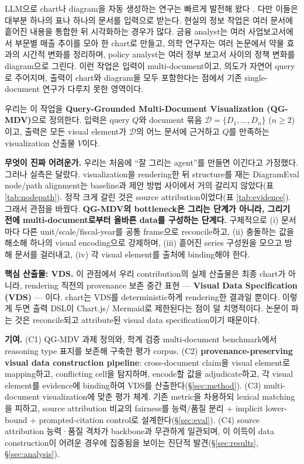 \documentclass[11pt]{article}
\begin{document}
LLM으로 chart나 diagram을 자동 생성하는 연구는 빠르게 발전해 왔다 \cite{han2023chartllama,
yang2024chartmimic}. 다만 이들은 대부분 하나의 표나 하나의 문서를 입력으로 받는다. 현실의 정보
작업은 여러 문서에 흩어진 내용을 통합한 뒤 시각화하는 경우가 많다. 금융 analyst는 여러
사업보고서에서 부문별 매출 추이를 모아 한 chart로 만들고, 의학 연구자는 여러 논문에서 약물 효과의
시간적 변화를 정리하며, policy analyst는 여러 정부 보고서 사이의 정책 변화를 diagram으로 그린다.
이런 작업은 입력이 multi-document이고, 의도가 자연어 query로 주어지며, 출력이 chart와 diagram을
모두 포함한다는 점에서 기존 single-document 연구가 다루지 못한 영역이다.

우리는 이 작업을 \textbf{Query-Grounded Multi-Document Visualization (QG-MDV)}으로 정의한다.
입력은 query $Q$와 document 묶음 $\mathcal{D}=\{D_1,\dots,D_n\}$ ($n\geq 2$)이고, 출력은 모든
visual element가 $\mathcal{D}$의 어느 문서에 근거하고 $Q$를 만족하는 visualization 산출물 $V$이다.

\textbf{무엇이 진짜 어려운가.} 우리는 처음에 ``잘 그리는 agent''를 만들면 이긴다고 가정했다.
그러나 실측은 달랐다. visualization을 rendering한 뒤 structure를 재는 DiagramEval node/path
alignment는 baseline과 제안 방법 사이에서 거의 갈리지 않았다(표 \ref{tab:nodepath}). 정작 크게
갈린 것은 source attribution이었다(표 \ref{tab:evidence}). 그래서 관점을 바꿨다. \textbf{QG-MDV의
bottleneck은 그리는 단계가 아니라, 그리기 전에 multi-document로부터 올바른 data를 구성하는
단계다.} 구체적으로 (i) 문서마다 다른 unit/scale/fiscal-year를 공통 frame으로 reconcile하고,
(ii) 충돌하는 값을 해소해 하나의 visual encoding으로 강제하며, (iii) 흩어진 series 구성원을 모으고
방해 문서를 걸러내고, (iv) 각 visual element를 출처에 binding해야 한다.

\textbf{핵심 산출물: VDS.} 이 관점에서 우리 contribution의 실제 산출물은 최종 chart가 아니라,
rendering 직전의 provenance 보존 중간 표현 — \textbf{Visual Data Specification (VDS)} — 이다.
chart는 VDS를 deterministic하게 rendering한 결과일 뿐이다. 이렇게 두면 출력 DSL이 Chart.js/
Mermaid로 제한된다는 점이 덜 치명적이다. 논문이 파는 것은 reconcile되고 attribute된 visual data
specification이기 때문이다.

\textbf{기여.}
(C1) QG-MDV 과제 정의와, 학계 검증 multi-document benchmark에서 reasoning type 표지를 보존해
구축한 평가 corpus.
(C2) \textbf{provenance-preserving visual data construction pipeline}: cross-document claim을
visual element로 mapping하고, conflicting cell을 탐지하며, encode할 값을 adjudicate하고, 각
visual element를 evidence에 binding하여 VDS를 산출한다(\S\ref{sec:method}).
(C3) multi-document visualization에 맞춘 평가 체계. 기존 metric을 차용하되 lexical matching을
피하고, source attribution 비교의 fairness를 능력/품질 분리 + implicit lower-bound +
prompted-citation control로 설계한다(\S\ref{sec:eval}).
(C4) source attribution 능력·품질 격차가 backbone과 무관하게 일관되며, 이 이득이 data
construction이 어려운 경우에 집중됨을 보이는 진단적 발견(\S\ref{sec:results}, \S\ref{sec:analysis}).
\end{document}
